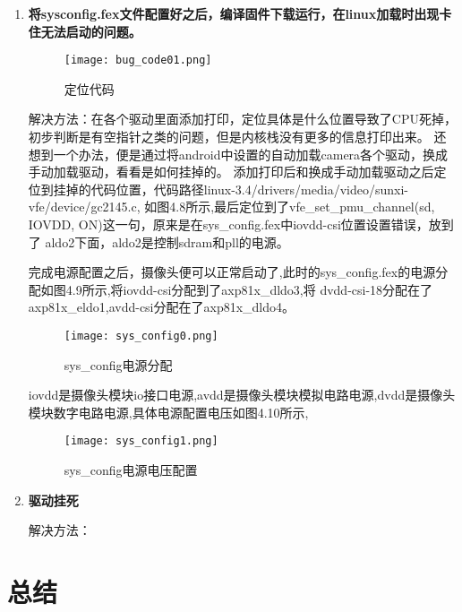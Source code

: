 \begin{enumerate}[1)]
\item \textbf{将sysconfig.fex文件配置好之后，编译固件下载运行，在linux加载时出现卡住无法启动的问题。}
\begin{figure}[H]
\centering
\texttt{[image: bug\_code01.png]}
\caption{定位代码\label{figur:bug_code01}}
\end{figure}

解决方法：在各个驱动里面添加打印，定位具体是什么位置导致了CPU死掉，初步判断是有空指针之类的问题，但是内核栈没有更多的信息打印出来。
还想到一个办法，便是通过将android中设置的自动加载camera各个驱动，换成手动加载驱动，看看是如何挂掉的。
添加打印后和换成手动加载驱动之后定位到挂掉的代码位置，代码路径linux-3.4/drivers/media/video/sunxi-vfe/device/gc2145.c,
如图4.8所示,最后定位到了vfe\_set\_pmu\_channel(sd, IOVDD, ON)这一句，原来是在sys\_config.fex中iovdd-csi位置设置错误，放到了
aldo2下面，aldo2是控制sdram和pll的电源。

完成电源配置之后，摄像头便可以正常启动了,此时的sys\_config.fex的电源分配如图4.9所示,将iovdd-csi分配到了axp81x\_dldo3,将
dvdd-csi-18分配在了axp81x\_eldo1,avdd-csi分配在了axp81x\_dldo4。
\begin{figure}[htbp]
\centering
\texttt{[image: sys\_config0.png]}
\caption{sys\_config电源分配\label{figur:sys_config0}}
\end{figure}

iovdd是摄像头模块io接口电源,avdd是摄像头模块模拟电路电源,dvdd是摄像头模块数字电路电源,具体电源配置电压如图4.10所示,
\begin{figure}[htbp]
\centering
\texttt{[image: sys\_config1.png]}
\caption{sys\_config电源电压配置\label{figur:sys_config1}}
\end{figure}



\item \textbf{驱动挂死}

解决方法：

\end{enumerate}

    
\section{总结}